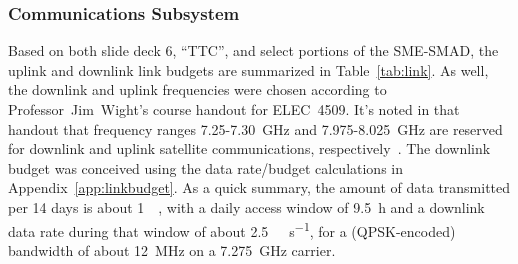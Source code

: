 \documentclass[9pt]{article}
\begin{document}
\subsubsection{Communications Subsystem}\label{sys:comms}
Based on both slide deck 6, ``TTC'', and select portions of the SME-SMAD, the uplink and downlink link budgets are summarized in Table~\ref{tab:link}.
As well, the downlink and uplink frequencies were chosen according to Professor~Jim~Wight's course handout for ELEC~4509.
It's noted in that handout that frequency ranges 7.25-7.30~GHz and 7.975-8.025~GHz are reserved for downlink and uplink satellite communications, respectively~\cite[II, p. 3]{commlinks}.
The downlink budget was conceived using the data rate/budget calculations in Appendix~\ref{app:linkbudget}.
As a quick summary, the amount of data transmitted per 14 days is about \qty{1}{\tera\byte}, with a daily access window of \qty{9.5}{\hour} and a downlink data rate during that window of about \qty{2.5}{\mega\byte\per\second}, for a (QPSK-encoded) bandwidth of about \qty{12}{\mega\hertz} on a \qty{7.275}{\giga\hertz} carrier.
\end{document}
